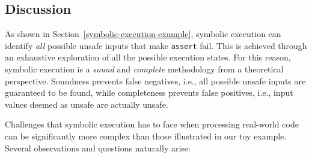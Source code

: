 
\subsection{Discussion}
\label{example-discussion}

As shown in Section~\ref{symbolic-execution-example}, symbolic execution can identify {\em all} possible unsafe inputs that make {\tt assert} fail. This is achieved through an exhaustive exploration of all the possible execution states. For this reason, symbolic execution is a {\em sound} and {\em complete} methodology from a theoretical perspective. Soundness prevents false negatives, i.e., all possible unsafe inputs are guaranteed to be found, while completeness prevents false positives, i.e.,  input values deemed as unsafe are actually unsafe. 

Challenges that symbolic execution has to face when processing real-world code can be significantly more complex than those illustrated in our toy example. Several observations and questions naturally arise:

